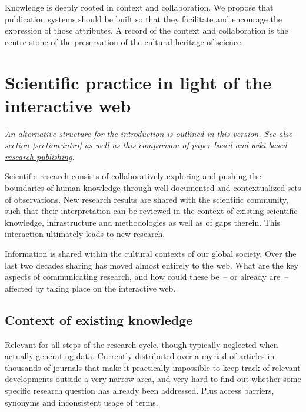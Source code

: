 \documentclass[final,authoryear,3p]{elsarticle-open-drafting}
\begin{document}
Knowledge is deeply rooted in context and collaboration. We propose that publication systems should be built so that 
they facilitate and encourage the expression of those attributes. A record of the context and collaboration is the 
centre stone of the preservation of the cultural heritage of science. 




\section{Scientific practice in light of the interactive web}
\label{section:intro2}
{\it An alternative structure for the introduction is outlined in \href{https://github.com/Daniel-Mietchen/Open-Research-Proposals/blob/1c101eb017c9bcb2a8ec72932eff36085bf64590/open-drafting.tex}{this version}. See also section \ref{section:intro} as well as \href{http://en.wikiversity.org/wiki/Wikis_in_scholarly_communication#Comparison_between_paper-based_and_wiki-based_scholarly_communication_systems}{this comparison of paper-based and wiki-based research publishing}.}

Scientific research consists of collaboratively exploring and pushing the boundaries of human knowledge through 
well-documented and contextualized sets of observations. New research results are shared with the scientific 
community, such that their interpretation can be reviewed in the context of existing scientific knowledge, infrastructure 
and methodologies as well as of gaps therein. This interaction ultimately leads to new research. 

Information is shared within the cultural contexts of our global society. Over the last two decades sharing has moved almost entirely to the web. What are the key aspects of communicating research, and how could these be~-- or already are~-- affected by taking place on the interactive web.

\subsection{Context of existing knowledge}
Relevant for all steps of the research cycle, though typically neglected when actually generating data. Currently distributed over a myriad of articles in thousands of journals that make it practically impossible to keep track of relevant developments outside a very narrow area, and very hard to find out whether some specific research question has already been addressed. Plus access barriers, synonyms and inconsistent usage of terms.
\end{document}
